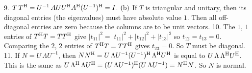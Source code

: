 9. \(T\,T^{\rm H}=U^{-1}\,AUU^{\rm H}A^{\rm H}(U^{-1})^{\rm H}=I\). \(({\rm b})\) If \(T\) is triangular and unitary, then its diagonal entries (the eigenvalues) must have absolute value \(1\). Then all off-diagonal entries are zero because the columns are to be unit vectors.
10. The \(1\), \(1\) entries of \(T^{\rm H}T=TT^{\rm H}\) give \(|t_{11}|^{2}=|t_{11}|^{2}+|t_{12}|^{2}+|t_{13}|^{2}\) so \(t_{12}=t_{13}=0\). Comparing the \(2\), \(2\) entries of \(T^{\rm H}T=TT^{\rm H}\) gives \(t_{23}=0\). So \(T\) must be diagonal.
11. If \(N=U\,\Lambda U^{-1}\), then \(NN^{\rm H}=U\,\Lambda U^{-1}(U^{-1})^{\rm H}\,\Lambda^{\rm H}U^{\rm H}\) is equal to \(U\,\Lambda\,\Lambda^{\rm H}U^{\rm H}\). This is the same as \(U\,\Lambda^{\rm H}\,\Lambda U^{\rm H}=(U\,\Lambda U^{-1})^{\rm H}(U\,\Lambda U^{- 1})=N^{\rm H}N\). So \(N\) is normal.

 